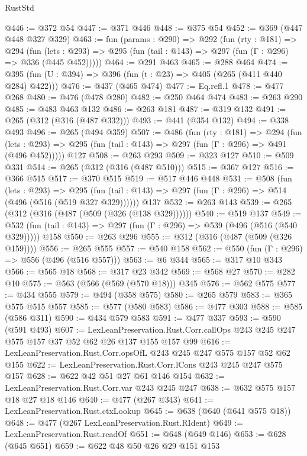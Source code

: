 \begin{lexlean}{RustStd}
\begin{coremodule}
@446 := @372 @54
@447 := @371 @446
@448 := @375 @54
@452 := @369 (@447 @448 @327 @329)
@463 := fun (params : @290) =>
  @292
    (fun (rty : @181) =>
    @294
      (fun (lets : @293) => @295 (fun (tail : @143) => @297 (fun (Γ : @296) => @336 (@445 @452)))))
@464 := @291 @463
@465 := @288 @464
@474 := @395 (fun (U : @394) => @396 (fun (t : @23) => @405 (@265 (@411 @440 @284) @422)))
@476 := @437 (@465 @474)
@477 := Eq.refl.{1}
@478 := @477 @268
@480 := @476 (@478 @280)
@482 := @250 @464 @474
@483 := @263 @290
@485 := @483 @463 @132
@486 := @263 @181
@487 := @319 @132
@491 := @265 (@312 (@316 (@487 @332)))
@493 := @441 (@354 @132)
@494 := @338 @493
@496 := @265 (@494 @359)
@507 := @486
    (fun (rty : @181) =>
    @294
      (fun (lets : @293) => @295 (fun (tail : @143) => @297 (fun (Γ : @296) => @491 (@496 @452)))))
    @127
@508 := @263 @293
@509 := @323 @127
@510 := @509 @331
@514 := @265 (@312 (@316 (@487 @510)))
@515 := @367 @127
@516 := @366 @515
@517 := @370 @515
@519 := @517 @446 @448
@531 := @508
    (fun (lets : @293) =>
    @295 (fun (tail : @143) => @297 (fun (Γ : @296) => @514 (@496 (@516 (@519 @327 @329))))))
    @137
@532 := @263 @143
@539 := @265 (@312 (@316 (@487 (@509 (@326 (@138 @329))))))
@540 := @519 @137
@549 := @532 (fun (tail : @143) => @297 (fun (Γ : @296) => @539 (@496 (@516 (@540 @329))))) @158
@550 := @263 @296
@555 := @312 (@316 (@487 (@509 (@326 @159))))
@556 := @265 @555
@557 := @540 @158
@562 := @550 (fun (Γ : @296) => @556 (@496 (@516 @557)))
@563 := @6 @344
@565 := @317 @10 @343
@566 := @565 @18
@568 := @317 @23 @342
@569 := @568 @27
@570 := @282 @10
@575 := @563 (@566 (@569 (@570 @18))) @345
@576 := @562 @575
@577 := @434 @555
@579 := @494 (@358 @575)
@580 := @265 @579
@583 := @365 @575 @515 @557
@585 := @577 (@580 @583)
@586 := @477 @303
@588 := @585 (@586 @311)
@590 := @434 @579 @583
@591 := @477 @337
@593 := @590 (@591 @493)
@607 := LexLeanPreservation.Rust.Corr.callOps
    @243
    @245
    @247
    @575
    @157
    @37
    @52
    @62
    @26
    @137
    @155
    @157
    @99
@616 := LexLeanPreservation.Rust.Corr.opsOfL @243 @245 @247 @575 @157 @52 @62 @155
@622 := LexLeanPreservation.Rust.Corr.lCons @243 @245 @247 @575 @157
@628 := @622 @42 @51 @27 @61 @146 @154
@632 := LexLeanPreservation.Rust.Corr.var @243 @245 @247
@638 := @632 @575 @157 @18 @27 @18 @146
@640 := @477 (@267 @343)
@641 := LexLeanPreservation.Rust.ctxLookup
@645 := @638 (@640 (@641 @575 @18))
@648 := @477 (@267 LexLeanPreservation.Rust.RIdent)
@649 := LexLeanPreservation.Rust.readOf
@651 := @648 (@649 @146)
@653 := @628 (@645 @651)
@659 := @622 @48 @50 @26 @29 @151 @153

\end{coremodule}
\end{lexlean}
